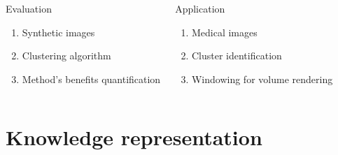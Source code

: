 \begin{frame}
						\begin{columns}[c]
						\column{17em}				
							\begin{alertblock}{Evaluation}
								\begin{enumerate}
									\item Synthetic images
									\item Clustering algorithm
									\item Method's benefits quantification
								\end{enumerate}	
							\end{alertblock}																							
						\column{17em}				
							\begin{alertblock}{Application}
								\begin{enumerate}
									\item Medical images						
									\item Cluster identification
									\item Windowing for volume rendering
								\end{enumerate}	
							\end{alertblock}																							
					\end{columns}
												

						



		\end{frame}


\section{Knowledge representation}
